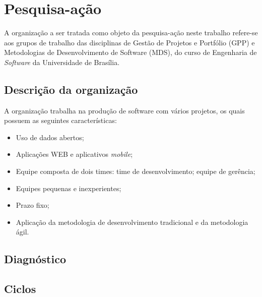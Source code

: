 \chapter{Pesquisa-ação}
\label{pesquisa_acao}

		A organização a ser tratada como objeto da pesquisa-ação neste trabalho refere-se aos grupos de trabalho das disciplinas de Gestão de Projetos
		e Portfólio (GPP) e Metodologias de Desenvolvimento de Software (MDS), do curso de Engenharia de \textit{Software}
		da Universidade de Brasília.

		\section{Descrição da organização}

			A organização trabalha na produção de software com vários projetos, os quais possuem as seguintes características:

			\begin{itemize}
				\item Uso de dados abertos;
				\item Aplicações WEB e aplicativos \textit{mobile};
				\item Equipe composta de dois times:
					 time de desenvolvimento;
					 equipe de gerência;
				\item Equipes pequenas e inexperientes;
				\item Prazo fixo;
				\item Aplicação da metodologia de desenvolvimento tradicional e da metodologia ágil.
			\end{itemize}

	\section{Diagnóstico}

	

	\section{Ciclos}

	




